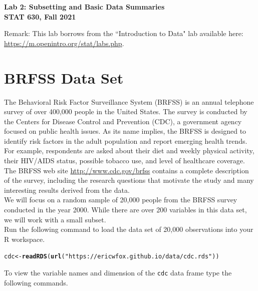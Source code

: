 \documentclass[11pt]{article}\usepackage[]{graphicx}\usepackage[]{color}
\makeatletter
\newcommand{\hlstr}[1]{\textcolor[rgb]{0.192,0.494,0.8}{#1}}%
\newcommand{\hlstd}[1]{\textcolor[rgb]{0.345,0.345,0.345}{#1}}%
\newcommand{\hlkwb}[1]{\textcolor[rgb]{0.69,0.353,0.396}{#1}}%
\newcommand{\hlkwd}[1]{\textcolor[rgb]{0.737,0.353,0.396}{\textbf{#1}}}%
\newenvironment{kframe}{%
 \def\at@end@of@kframe{}%
 \ifinner\ifhmode%
  \def\at@end@of@kframe{\end{minipage}}%
  \begin{minipage}{\columnwidth}%
 \fi\fi%
 \def\FrameCommand##1{\hskip\@totalleftmargin \hskip-\fboxsep
 \colorbox{shadecolor}{##1}\hskip-\fboxsep
     \hskip-\linewidth \hskip-\@totalleftmargin \hskip\columnwidth}%
 \MakeFramed {\advance\hsize-\width
   \@totalleftmargin\z@ \linewidth\hsize
   \@setminipage}}%
 {\par\unskip\endMakeFramed%
 \at@end@of@kframe}
\newenvironment{knitrout}{}{} %
\makeatother
\begin{document}
\setlength\parindent{0pt}

\Large
\textbf{Lab 2: Subsetting and Basic Data Summaries}\\
\large
\textbf{STAT 630, Fall 2021}\\
\normalsize

Remark:  This lab borrows from the ``Introduction to Data" lab available here:\\ \url{https://m.openintro.org/stat/labs.php}.    


\section{BRFSS Data Set}

The Behavioral Risk Factor Surveillance System (BRFSS) is an annual telephone 
survey of over 400,000 people in the United States. The survey is conducted by the Centers for Disease Control and Prevention (CDC), a government agency focused on public health issues.  As its name implies, the BRFSS 
is designed to identify risk factors in the adult population and report 
emerging health trends. For example, respondents are asked about their diet and 
weekly physical activity, their HIV/AIDS status, possible tobacco use, and level of healthcare coverage. The BRFSS web site 
\url{http://www.cdc.gov/brfss} contains a complete 
description of the survey, including the research questions that motivate the 
study and many interesting results derived from the data.\\

We will focus on a random sample of 20,000 people from the BRFSS survey 
conducted in the year 2000. While there are over 200  variables in this data set, we will
work with a small subset.\\

Run the following command to load the data set of 20,000 observations into your R workspace. 

\begin{knitrout}
\color{fgcolor}\begin{kframe}
\begin{alltt}
\hlstd{cdc} \hlkwb{<-} \hlkwd{readRDS}\hlstd{(}\hlkwd{url}\hlstd{(}\hlstr{"https://ericwfox.github.io/data/cdc.rds"}\hlstd{))}
\end{alltt}
\end{kframe}
\end{knitrout}


To view the variable names and dimension of the \texttt{cdc} data frame type the following commands.
\end{document}
